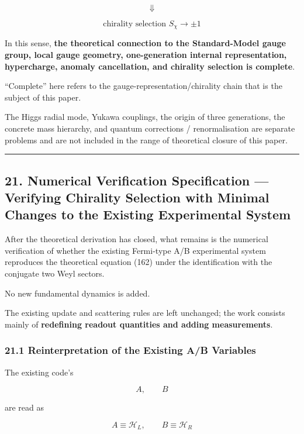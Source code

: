 \documentclass[
  a4paper,
]{article}
\begin{document}
\[
\Downarrow
\]

\[
\boxed{
\text{chirality selection }S_\chi\to\pm1
}
\tag{172}
\]

In this sense, \textbf{the theoretical connection to the Standard-Model
gauge group, local gauge geometry, one-generation internal
representation, hypercharge, anomaly cancellation, and chirality
selection is complete}.

``Complete'' here refers to the gauge-representation/chirality chain
that is the subject of this paper.

The Higgs radial mode, Yukawa couplings, the origin of three
generations, the concrete mass hierarchy, and quantum corrections /
renormalisation are separate problems and are not included in the range
of theoretical closure of this paper.

\begin{center}\rule{0.5\linewidth}{0.5pt}\end{center}

\subsection{21. Numerical Verification Specification --- Verifying
Chirality Selection with Minimal Changes to the Existing Experimental
System}\label{numerical-verification-specification-verifying-chirality-selection-with-minimal-changes-to-the-existing-experimental-system}

After the theoretical derivation has closed, what remains is the
numerical verification of whether the existing Fermi-type A/B
experimental system reproduces the theoretical equation (162) under the
identification with the conjugate two Weyl sectors.

No new fundamental dynamics is added.

The existing update and scattering rules are left unchanged; the work
consists mainly of \textbf{redefining readout quantities and adding
measurements}.

\subsubsection{21.1 Reinterpretation of the Existing A/B
Variables}\label{reinterpretation-of-the-existing-ab-variables}

The existing code's

\[
A,\qquad B
\]

are read as

\[
\boxed{
A\equiv\mathcal H_L,
\qquad
B\equiv\mathcal H_R
}
\tag{173}
\]
\end{document}
